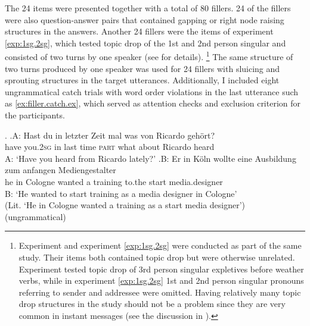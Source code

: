 The 24 items were presented together with a total of 80 fillers.
24 of the fillers were also question-answer pairs that contained gapping or right node raising structures in the answers.
Another 24 fillers were the items of experiment \ref*{exp:1sg.2sg}, which tested topic drop of the 1st and 2nd person singular and consisted of two turns by one speaker (see  for details).%
\footnote{Experiment  and experiment \ref*{exp:1sg.2sg} were conducted as part of the same study.
Their items both contained topic drop but were otherwise unrelated.
Experiment  tested topic drop of 3rd person singular expletives before weather verbs, while in experiment \ref*{exp:1sg.2sg} 1st and 2nd person singular pronouns referring to sender and addressee were omitted.
Having relatively many topic drop structures in the study should not be a problem since they are very common in instant messages (see the discussion in ).
}
The same structure of two turns produced by one speaker was used for 24 fillers with sluicing and sprouting structures in the target utterances.
Additionally, I included eight ungrammatical catch trials with word order violations in the last utterance such as \ref{ex:filler.catch.ex}, which served as attention checks and exclusion criterion for the participants.

\ex.\label{ex:filler.catch.ex}
\ag.A: Hast du in letzter Zeit mal was von Ricardo gehört?\\
{} have you.\textsc{2sg} in last time \textsc{part} what about Ricardo heard\\
A: `Have you heard from Ricardo lately?'
\bg.B: Er in Köln wollte eine Ausbildung zum anfangen Mediengestalter\\
{} he in Cologne wanted a training to.the start media.designer\\
B: `He wanted to start training as a media designer in Cologne' \\
(Lit. `He in Cologne wanted a training as a start media designer') \\\phantom{.} \hfill (ungrammatical)%


